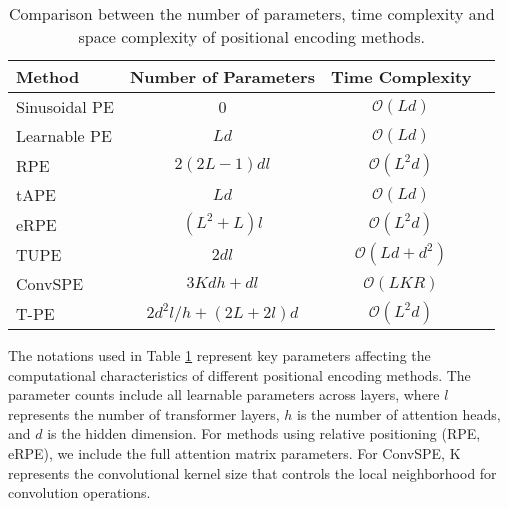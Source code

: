 \begin{table}[t]
\caption{\small Comparison between the number of parameters, time complexity and space complexity of positional encoding methods.}
\begin{adjustbox}{width=\columnwidth}
\centering
\setlength{\tabcolsep}{4pt} %
\begin{tabular}{lccc}
\toprule

\textbf{Method} & \textbf{Number of Parameters} & \textbf{Time Complexity} &  \\
\midrule
Sinusoidal PE & 0 & $\mathcal{O}(Ld)$  \\
Learnable PE & $Ld$ & $\mathcal{O}(Ld)$  \\
RPE & $2(2L-1)dl$ & $\mathcal{O}(L^2d)$  \\
tAPE & $Ld$ & $\mathcal{O}(Ld)$  \\
eRPE & $(L^2 + L)l$ & $\mathcal{O}(L^2d)$  \\
TUPE & $2dl$ & $\mathcal{O}(Ld + d^2)$  \\
ConvSPE & $3Kdh + dl$ & $\mathcal{O}(LKR)$ \\
T-PE & $2d^2l/h + (2L + 2l)d$ & $\mathcal{O}(L^2d)$  \\
\bottomrule
\end{tabular}
\end{adjustbox}
\label{table:parameter}
\end{table}

The notations used in Table \ref{table:parameter} represent key parameters affecting the computational characteristics of different positional encoding methods. The parameter counts include all learnable parameters across layers, where $l$ represents the number of transformer layers, $h$ is the number of attention heads, and $d$ is the hidden dimension. For methods using relative positioning (RPE, eRPE), we include the full attention matrix parameters. For ConvSPE, K represents the convolutional kernel size that controls the local neighborhood for convolution operations.